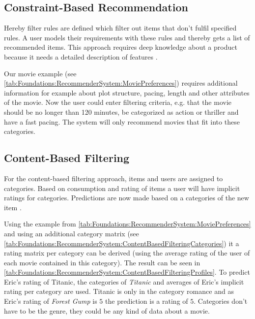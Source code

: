 \subsection{Constraint-Based Recommendation}
Hereby filter rules are defined which filter out items that don't fulfil specified rules. A user models their requirements with these rules and thereby gets a list of recommended items. This approach requires deep knowledge about a product because it needs a detailed description of features  \cite[~ p. 12]{felfernigDecisionTasksBasic2018}.

Our movie example (see \autoref{tab:Foundations:RecommenderSystem:MoviePreferences}) requires additional information for example about plot structure, pacing, length and other attributes of the movie. Now the user could enter filtering criteria, e.g. that the movie should be no longer than 120 minutes, be categorized as action or thriller and have a fast pacing. The system will only recommend movies that fit into these categories.

\subsection{Content-Based Filtering}
For the content-based filtering approach, items and users are assigned to categories. Based on consumption and rating of items a user will have implicit ratings for categories. Predictions are now made based on a categories of the new item \cite[~ pp. 10, 11]{felfernigDecisionTasksBasic2018}.

Using the example from \autoref{tab:Foundations:RecommenderSystem:MoviePreferences} and using an additional category matrix (see \autoref{tab:Foundations:RecommenderSystem:ContentBasedFilteringCategories}) it a rating matrix per category can be derived (using the average rating of the user of each movie contained in this category). The result can be seen in \autoref{tab:Foundations:RecommenderSystem:ContentBasedFilteringProfiles}. To predict Eric's rating of Titanic, the categories of \textit{Titanic} and averages of Eric's implicit rating per category are used. Titanic is only in the category romance and as Eric's rating of \textit{Forest Gump} is $5$ the prediction is a rating of $5$. Categories don't have to be the genre, they could be any kind of data about a movie.

